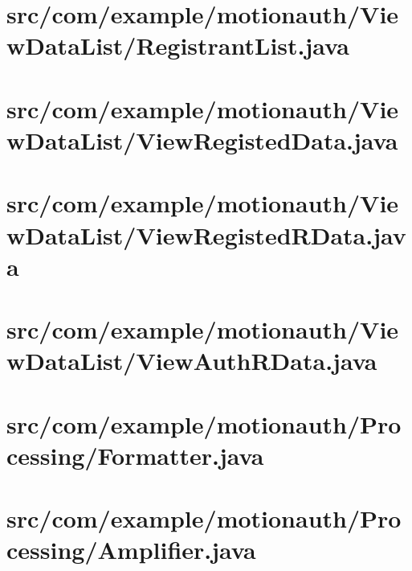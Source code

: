 \documentclass[11pt]{jreport}
\renewcommand{\slash}{/}
\begin{document}
    \section{src\slash com\slash example\slash motionauth\slash ViewDataList\slash RegistrantList.java}
    

    \section{src\slash com\slash example\slash motionauth\slash ViewDataList\slash ViewRegistedData.java}
    

    \section{src\slash com\slash example\slash motionauth\slash ViewDataList\slash ViewRegistedRData.java}
    

    \section{src\slash com\slash example\slash motionauth\slash ViewDataList\slash ViewAuthRData.java}
    

    \section{src\slash com\slash example\slash motionauth\slash Processing\slash Formatter.java}
    

    \section{src\slash com\slash example\slash motionauth\slash Processing\slash Amplifier.java}
    
\end{document}
